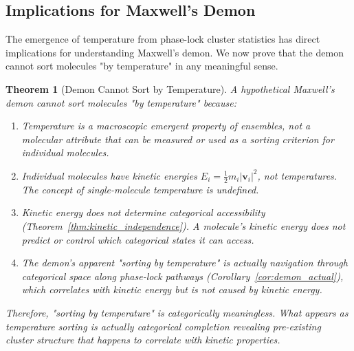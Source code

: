 \documentclass[12pt,a4paper]{article}
\newtheorem{theorem}{Theorem}[section]
\theoremstyle{definition}
\theoremstyle{remark}
\begin{document}
\subsection{Implications for Maxwell's Demon}

The emergence of temperature from phase-lock cluster statistics has direct implications for understanding Maxwell's demon. We now prove that the demon cannot sort molecules "by temperature" in any meaningful sense.

\begin{theorem}[Demon Cannot Sort by Temperature]
\label{thm:demon_cannot_sort}
A hypothetical Maxwell's demon cannot sort molecules "by temperature" because:
\begin{enumerate}
    \item Temperature is a macroscopic emergent property of ensembles, not a molecular attribute that can be measured or used as a sorting criterion for individual molecules.
    \item Individual molecules have kinetic energies $E_i = \frac{1}{2} m_i |\mathbf{v}_i|^2$, not temperatures. The concept of single-molecule temperature is undefined.
    \item Kinetic energy does not determine categorical accessibility (Theorem~\ref{thm:kinetic_independence}). A molecule's kinetic energy does not predict or control which categorical states it can access.
    \item The demon's apparent "sorting by temperature" is actually navigation through categorical space along phase-lock pathways (Corollary~\ref{cor:demon_actual}), which correlates with kinetic energy but is not caused by kinetic energy.
\end{enumerate}
Therefore, "sorting by temperature" is categorically meaningless. What appears as temperature sorting is actually categorical completion revealing pre-existing cluster structure that happens to correlate with kinetic properties.
\end{theorem}
\end{document}
